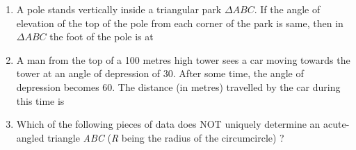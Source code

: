 \documentclass[journal,12pt,twocolumn]{IEEEtran}
\begin{document}
\begin{enumerate}
 \begin{itemize}
 \end{itemize}
 \item A pole stands vertically inside a triangular park $\Delta ABC$. If the angle of elevation of the top of the pole from each corner of the park is same, then in $\Delta ABC$ the foot of the pole is at
 \begin{itemize}
 \end{itemize}
 \item A man from the top of a 100 metres high tower sees a car moving towards the tower at an angle of depression of 30\degree. After some time, the angle of depression becomes 60\degree. The distance (in metres) travelled by the car during this time is
 \begin{itemize}
 \end{itemize}
 \item Which of the following pieces of data does NOT uniquely determine an acute-angled triangle \textsl{ABC} (\textsl{R} being the radius of the circumcircle) ?
 \begin{itemize}
\end{itemize}
\end{enumerate}
\end{document}
